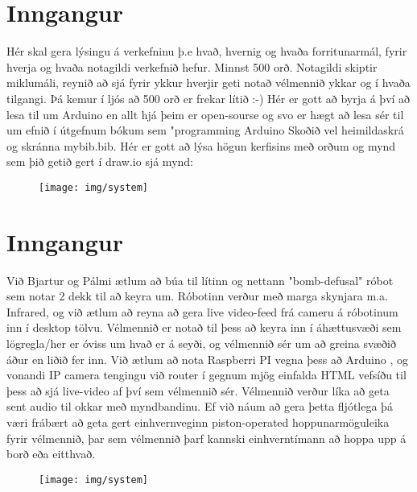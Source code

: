 \section{Inngangur}
Hér skal gera lýsingu á verkefninu þ.e hvað,  hvernig og  hvaða forritunarmál, fyrir hverja og hvaða notagildi verkefnið hefur. Minnst 500 orð. Notagildi skiptir miklumáli, reynið að sjá fyrir ykkur hverjir geti notað vélmennið ykkar og í hvaða tilgangi.  Þá kemur í ljós að 500 orð er frekar lítið :-) Hér er gott að byrja á því að lesa til um Arduino en allt hjá þeim er open-sourse og svo er hægt að lesa sér til um efnið í útgefnum bókum sem "programming Arduino \cite{monk} Skoðið vel heimildaskrá og skránna mybib.bib. Hér er gott að lýsa högun kerfisins með orðum og mynd sem þið getið gert í draw.io sjá mynd: 
\begin{figure}[h]
\texttt{[image: img/system]}
\end{figure}

\section{Inngangur}
Við Bjartur og Pálmi ætlum að búa til lítinn og nettann "bomb-defusal" róbot sem notar 2 dekk til að keyra um. Róbotinn verður með marga skynjara m.a. Infrared, og við ætlum að reyna að gera live video-feed frá cameru á róbotinum inn í desktop tölvu. Vélmennið er notað til þess að keyra inn í áhættusvæði sem lögregla/her er óviss um hvað er á seyði, og vélmennið sér um að greina svæðið áður en liðið fer inn. Við ætlum að nota Raspberri PI vegna þess að Arduino , og vonandi IP camera tengingu við router í gegnum mjög einfalda HTML vefsíðu til þess að sjá live-video af því sem vélmennið sér. Vélmennið verður líka að geta sent audio til okkar með myndbandinu. Ef við náum að gera þetta fljótlega þá væri frábært að geta gert einhvernveginn piston-operated hoppunarmöguleika fyrir vélmennið, þar sem vélmennið þarf kannski einhverntímann að hoppa upp á borð eða eitthvað.


\begin{figure}[h]
\texttt{[image: img/system]}
\end{figure}